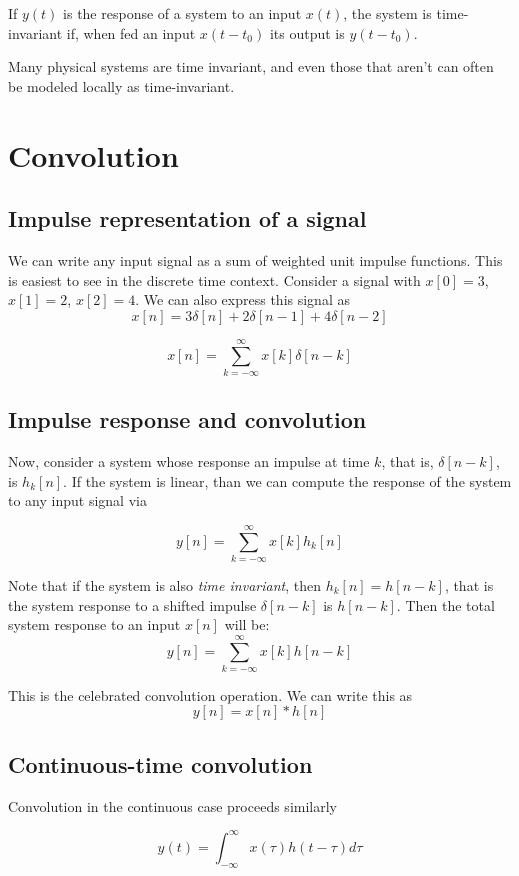 If $y(t)$ is the response of a system to an input $x(t)$, the system
is time-invariant if, when fed an input $x(t-t_0)$ its output is $y(t
- t_0)$.
 
Many physical systems are time invariant, and even those that aren't
can often be modeled locally as time-invariant. 



\section{Convolution}


\subsection{Impulse representation of a signal}
We can write any input signal as a sum of weighted unit impulse
functions. This is easiest to see in the discrete time context. 
Consider a signal with $x[0]=3$, $x[1]=2$, $x[2] = 4$. We can also 
express this signal as 
\[
x[n] = 3\delta[n] + 2\delta[n-1] + 4\delta[n-2]
\]  

\[
x[n] = \sum_{k=-\infty}^\infty x[k]\delta[n-k]
\]

\subsection{Impulse response and convolution}
Now, consider a system whose response an impulse at time $k$, 
that is, $\delta[n-k]$, is $h_k[n]$. If the system is linear,
than we can compute the response of the system to any input signal
via

\[
y[n] = \sum_{k=-\infty}^{\infty} x[k] h_k[n]
\]

Note that if the system is also \textit{time invariant}, then
$h_k[n] = h[n -k]$, that is the system response to a shifted
impulse $\delta[n-k]$ is $h[n-k]$. Then the total system
response to an input $x[n]$ will be: 
\[
y[n] = \sum_{k=-\infty}^\infty x[k] h[n-k]
\]

This is the celebrated convolution operation. We can 
write this as
\[
y[n] = x[n] * h[n]
\]


\subsection{Continuous-time convolution}

Convolution in the continuous case proceeds similarly

\[
y(t) = \int_{-\infty}^{\infty} x(\tau) h(t - \tau) d\tau
\]


